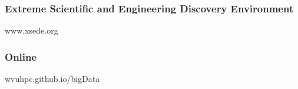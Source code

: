 
\begin{frame}
		\frametitle{Extreme Scientific and Engineering Discovery Environment}
		www.xsede.org
\end{frame}

\begin{frame}
		\frametitle{Online}
		wvuhpc.github.io/bigData
\end{frame}
